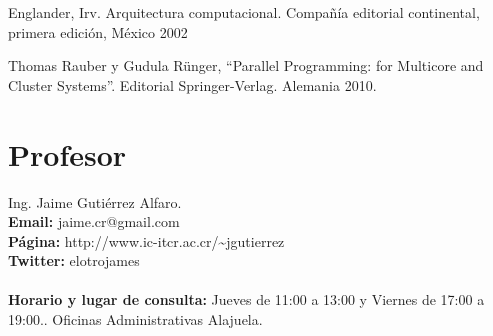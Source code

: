 \documentclass[11pt,fleqn]{report}
\begin{document}
Englander, Irv. Arquitectura computacional. Compañía editorial
continental, primera edición, México 2002

Thomas Rauber y Gudula Rünger, ``Parallel Programming: for Multicore and
Cluster Systems''. Editorial Springer-Verlag. Alemania 2010.


\section{Profesor}

Ing. Jaime Gutiérrez Alfaro. \vspace{5mm} \\
\textbf{Email:} jaime.cr@gmail.com \\
\textbf{Página:} http://www.ic-itcr.ac.cr/\textasciitilde{}jgutierrez \\
\textbf{Twitter:} elotrojames
\\
\\
\textbf{Horario y lugar de consulta:} Jueves de 11:00 a 13:00 y Viernes de 17:00 a 19:00.. Oficinas Administrativas Alajuela.
\end{document}
